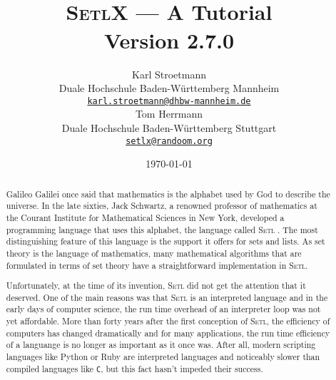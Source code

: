 \documentclass[twoside]{report}
\title{\vspace*{-1cm}
  \epsfig{file=aleph0.eps,scale=0.21} \\[0.5cm]
\textsc{SetlX} --- A Tutorial \\[0.5cm]
Version 2.7.0
}
\author{Karl Stroetmann \\[0.2cm]
Duale Hochschule Baden-W\"urttemberg Mannheim \\[0.2cm]
\href{mailto:karl.stroetmann@dhbw-mannheim.de}{\texttt{karl.stroetmann@dhbw-mannheim.de}} \\[0.5cm]
 Tom Herrmann  \\[0.2cm]
Duale Hochschule Baden-W\"urttemberg Stuttgart \\[0.2cm]
\href{mailto:setlx@randoom.org}{\texttt{setlx@randoom.org}}
}
\date{\today}
\begin{document}
\maketitle

\begin{abstract}
Galileo Galilei once said that mathematics is the alphabet used by God to describe the universe.
In the late sixties, Jack Schwartz, a renowned professor of mathematics at the Courant Institute for
Mathematical Sciences in New York, developed a programming language that uses this alphabet, the
language called \textsc{Setl} \cite{schwartz:1970, setl86}.  The most distinguishing feature of this language is the
support it offers for sets and lists.   As set theory is the language of mathematics, many mathematical
algorithms that are formulated in terms of set theory have a straightforward implementation in
\textsc{Setl}. 

Unfortunately, at the time of its invention, \textsc{Setl} did not get the attention that it deserved.
One of the main reasons was that \textsc{Setl} is an interpreted language and in the early days of
computer science, the run time overhead of an interpreter loop was not yet affordable.  More than
forty years after the first conception of \textsc{Setl}, the efficiency of computers has changed
dramatically and for many applications, the run time efficiency of a languange is no
longer as important as it once was.  After all, 
modern scripting languages like Python \cite{vanRossum:95} or Ruby \cite{flanagan:2008}
are interpreted languages and noticeably slower than compiled languages like \texttt{C}, but this
fact hasn't impeded their success. 


\end{abstract}
\end{document}
